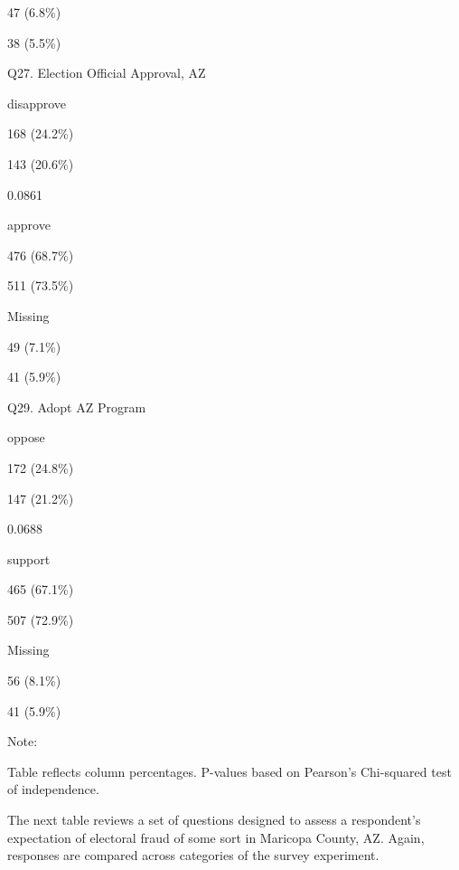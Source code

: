 \documentclass[
  11pt,
  a4paper,
]{article}
\begin{document}
\begin{table}
{47 (6.8\%)

38 (5.5\%)

Q27. Election Official Approval, AZ

disapprove

168 (24.2\%)

143 (20.6\%)

0.0861

approve

476 (68.7\%)

511 (73.5\%)

Missing

49 (7.1\%)

41 (5.9\%)

Q29. Adopt AZ Program

oppose

172 (24.8\%)

147 (21.2\%)

0.0688

support

465 (67.1\%)

507 (72.9\%)

Missing

56 (8.1\%)

41 (5.9\%)

{Note: }

Table reflects column percentages. P-values based on Pearson's
Chi-squared test of independence.

}

\end{table}%

The next table reviews a set of questions designed to assess a
respondent's expectation of electoral fraud of some sort in Maricopa
County, AZ. Again, responses are compared across categories of the
survey experiment.
\end{document}
